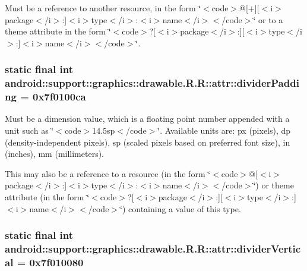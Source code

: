 Must be a reference to another resource, in the form \char`\"{}$<$code$>$@\mbox{[}+\mbox{]}\mbox{[}$<$i$>$package$<$/i$>$:\mbox{]}$<$i$>$type$<$/i$>$:$<$i$>$name$<$/i$>$$<$/code$>$\char`\"{} or to a theme attribute in the form \char`\"{}$<$code$>$?\mbox{[}$<$i$>$package$<$/i$>$:\mbox{]}\mbox{[}$<$i$>$type$<$/i$>$:\mbox{]}$<$i$>$name$<$/i$>$$<$/code$>$\char`\"{}. \hypertarget{classandroid_1_1support_1_1graphics_1_1drawable_1_1_r_1_1attr_cd07295d36c6c938327fbe2bff718016}{
\subsubsection[{dividerPadding}]{\setlength{\rightskip}{0pt plus 5cm}static final int android::support::graphics::drawable.R.R::attr::dividerPadding = 0x7f0100ca}}
\label{classandroid_1_1support_1_1graphics_1_1drawable_1_1_r_1_1attr_cd07295d36c6c938327fbe2bff718016}


Must be a dimension value, which is a floating point number appended with a unit such as \char`\"{}$<$code$>$14.5sp$<$/code$>$\char`\"{}. Available units are: px (pixels), dp (density-independent pixels), sp (scaled pixels based on preferred font size), in (inches), mm (millimeters). 

This may also be a reference to a resource (in the form \char`\"{}$<$code$>$@\mbox{[}$<$i$>$package$<$/i$>$:\mbox{]}$<$i$>$type$<$/i$>$:$<$i$>$name$<$/i$>$$<$/code$>$\char`\"{}) or theme attribute (in the form \char`\"{}$<$code$>$?\mbox{[}$<$i$>$package$<$/i$>$:\mbox{]}\mbox{[}$<$i$>$type$<$/i$>$:\mbox{]}$<$i$>$name$<$/i$>$$<$/code$>$\char`\"{}) containing a value of this type. \hypertarget{classandroid_1_1support_1_1graphics_1_1drawable_1_1_r_1_1attr_d61c186b9bac12132827b67e8681b761}{
\subsubsection[{dividerVertical}]{\setlength{\rightskip}{0pt plus 5cm}static final int android::support::graphics::drawable.R.R::attr::dividerVertical = 0x7f010080}}
\label{classandroid_1_1support_1_1graphics_1_1drawable_1_1_r_1_1attr_d61c186b9bac12132827b67e8681b761}


